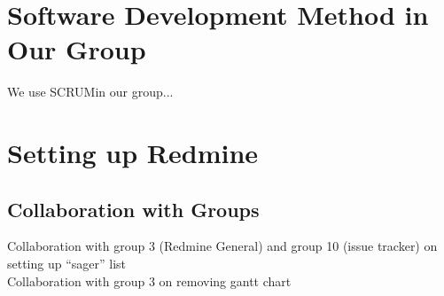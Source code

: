 \section{Software Development Method in Our Group}
We use SCRUM\@ in our group...

\section{Setting up Redmine}
\subsection{Collaboration with Groups}
Collaboration with group 3 (Redmine General) and group 10 (issue tracker) on setting up ``sager'' list\\
Collaboration with group 3 on removing gantt chart